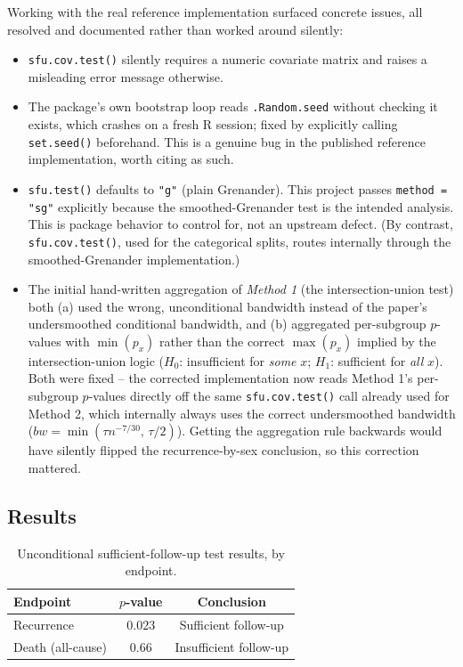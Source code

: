\documentclass[11pt]{article}
\begin{document}
Working with the real reference implementation surfaced concrete issues, all
resolved and documented rather than worked around silently:

\begin{itemize}[nosep]
    \item \texttt{sfu.cov.test()} silently requires a numeric covariate matrix and
    raises a misleading error message otherwise.
    \item The package's own bootstrap loop reads \texttt{.Random.seed} without
    checking it exists, which crashes on a fresh R session; fixed by explicitly
    calling \texttt{set.seed()} beforehand. This is a genuine bug in the published
    reference implementation, worth citing as such.
    \item \texttt{sfu.test()} defaults to \texttt{"g"} (plain Grenander). This
    project passes \texttt{method = "sg"} explicitly because the smoothed-Grenander
    test is the intended analysis. This is package behavior to control for, not an
    upstream defect. (By contrast, \texttt{sfu.cov.test()}, used for the categorical
    splits, routes internally through the smoothed-Grenander implementation.)
    \item The initial hand-written aggregation of \emph{Method 1} (the
    intersection-union test) both (a) used the wrong, unconditional bandwidth
    instead of the paper's undersmoothed conditional bandwidth, and (b) aggregated
    per-subgroup $p$-values with $\min(p_x)$ rather than the correct
    $\max(p_x)$ implied by the intersection-union logic ($H_0$: insufficient for
    \emph{some} $x$; $H_1$: sufficient for \emph{all} $x$). Both were fixed --
    the corrected implementation now reads Method 1's per-subgroup $p$-values
    directly off the same \texttt{sfu.cov.test()} call already used for Method 2,
    which internally always uses the correct undersmoothed bandwidth
    ($bw = \min(\tau n^{-7/30},\, \tau/2)$). Getting the aggregation rule backwards
    would have silently flipped the recurrence-by-sex conclusion, so this
    correction mattered.
\end{itemize}

\subsection{Results}

\begin{table}[h]
\centering
\caption{Unconditional sufficient-follow-up test results, by endpoint.}
\begin{tabular}{lcc}
\toprule
Endpoint & $p$-value & Conclusion \\
\midrule
Recurrence & 0.023 & Sufficient follow-up \\
Death (all-cause) & 0.66 & Insufficient follow-up \\
\bottomrule
\end{tabular}
\end{table}
\end{document}
